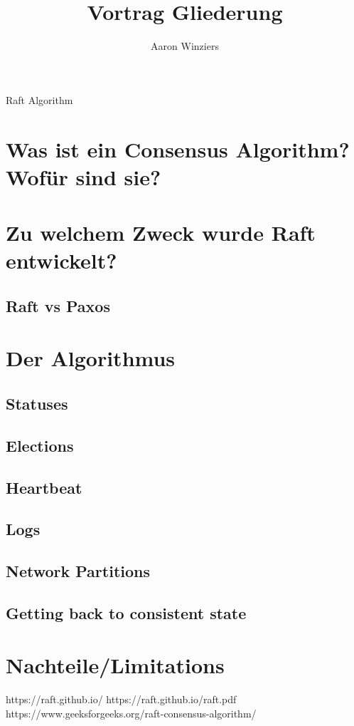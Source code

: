 \documentclass[10pt,a4paper]{article}
\author{Aaron Winziers}
\title{Vortrag Gliederung}
\begin{document}
	Raft Algorithm
	
	\section{Was ist ein Consensus Algorithm? Wofür sind sie?}
	
	\section{Zu welchem Zweck wurde Raft entwickelt?}
	\subsection{Raft vs Paxos}
	
	\section{Der Algorithmus}
	\subsection{Statuses}
	\subsection{Elections}
	\subsection{Heartbeat}
	\subsection{Logs}
	\subsection{Network Partitions}
	\subsection{Getting back to consistent state}
	\section{Nachteile/Limitations}
	
	
	https://raft.github.io/
	https://raft.github.io/raft.pdf
	https://www.geeksforgeeks.org/raft-consensus-algorithm/
	
\end{document}
